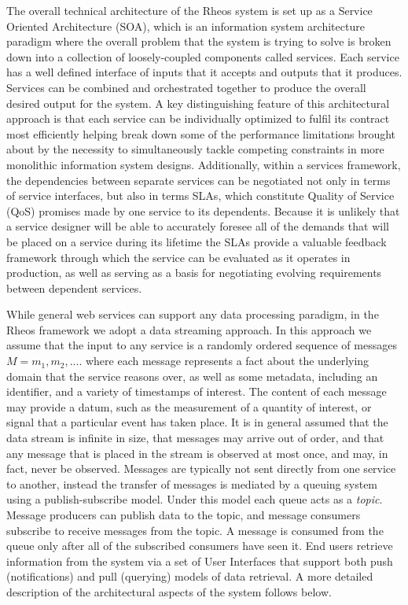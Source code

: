 The overall technical architecture of the Rheos system is set up as a Service Oriented Architecture (SOA)\autocite{shaw1996software}, which is an information system architecture paradigm where the overall problem that the system is trying to solve is broken down into a collection of loosely-coupled components called services. Each service has a well defined interface of inputs that it accepts and outputs that it produces. Services can be combined and orchestrated together to produce the overall desired output for the system. A key distinguishing feature of this architectural approach is that each service can be individually optimized to fulfil its contract most efficiently helping break down some of the performance limitations brought about by the necessity to simultaneously tackle competing constraints in more monolithic information system designs. Additionally, within a services framework, the dependencies between separate services can be negotiated not only in terms of service interfaces, but also in terms SLAs, which constitute Quality of Service (QoS) promises made by one service to its dependents\autocite{ingham2000constructing}. Because it is unlikely that a service designer will be able to accurately foresee all of the demands that will be placed on a service during its lifetime the SLAs provide a valuable feedback framework through which the service can be evaluated as it operates in production, as well as serving as a basis for negotiating evolving requirements between dependent services.

While general web services can support any data processing paradigm, in the Rheos framework we adopt a data streaming approach\autocite{babcock2002models}. In this approach we assume that the input to any service is a randomly ordered sequence of messages $M = {m_1, m_2, ....}$ where each message represents a fact about the underlying domain that the service reasons over, as well as some metadata, including an identifier, and a variety of timestamps of interest. The content of each message may provide a datum, such as the measurement of a quantity of interest, or signal that a particular event has taken place. It is in general assumed that the data stream is infinite in size, that messages may arrive out of order, and that any message that is placed in the stream is observed at most once, and may, in fact, never be observed. Messages are typically not sent directly from one service to another, instead the transfer of messages is mediated by a queuing system using a publish-subscribe\autocite{eugster2003many} model. Under this model each queue acts as a \emph{topic}. Message producers can publish data to the topic, and message consumers subscribe to receive messages from the topic. A message is consumed from the queue only after all of the subscribed consumers have seen it. End users retrieve information from the system via a set of User Interfaces that support both push (notifications) and pull (querying) models of data retrieval. A more detailed description of the architectural aspects of the system follows below.

